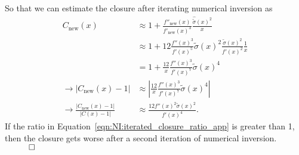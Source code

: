 \noindent So that we can estimate the closure after iterating numerical inversion as
\begin{align}
C_\text{new}(x) &\approx 1+\frac{f''_\text{new}(x)}{f'_\text{new}(x)^3}\frac{\hat{\tilde{\sigma}}(x)^2}{x}\nonumber\\
&\approx 1+12\frac{f''(x)^3}{f'(x)^5}\tilde{\sigma}(x)^2\frac{\tilde{\sigma}(x)^2}{f'(x)^2}\frac{1}{x}\nonumber\\
&=1+\frac{12}{x}\frac{f''(x)^3}{f'(x)^7}\tilde{\sigma}(x)^4\\
\rightarrow |C_\text{new}(x)-1| &\approx \left|\frac{12}{x}\frac{f''(x)^3}{f'(x)^7}\tilde{\sigma}(x)^4\right|\\
\rightarrow \frac{|C_\text{new}(x)-1|}{|C(x)-1|} &\approx \frac{12f''(x)^2\tilde{\sigma}(x)^2}{f'(x)^4}.\label{eqn:NI:iterated_closure_ratio_app}
\end{align}
If the ratio in Equation~\ref{eqn:NI:iterated_closure_ratio_app} is greater than 1, then the closure gets worse after a second iteration of numerical inversion. $\hspace{1 cm} \Box$

